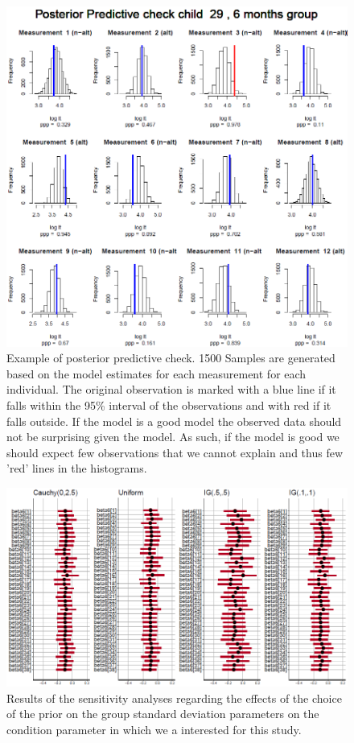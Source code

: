 \documentclass[openright,titlepage,12pt,a4paper]{book}
\begin{document}
\begin{figure}[H]

{\centering \includegraphics[width=0.9\linewidth]{figures/chapter_4/Figure9} 

}

\caption{Example of posterior predictive check. 1500 Samples are generated based on the model estimates for each measurement for each individual. The original observation is marked with a blue line if it falls within the 95\% interval of the observations and with red if it falls outside. If the model is a good model the observed data should not be surprising given the model. As such, if the model is good we should expect few observations that we cannot explain and thus few 'red' lines in the histograms. }\label{fig:ch04fig9}
\end{figure}

\begin{figure}

{\centering \includegraphics[width=0.85\linewidth]{figures/chapter_4/Figure10} 

}

\caption{Results of the sensitivity analyses regarding the effects of the choice of the prior on the group standard deviation parameters  on the condition parameter in which we a interested for this study.}\label{fig:ch04fig10}
\end{figure}
\end{document}
